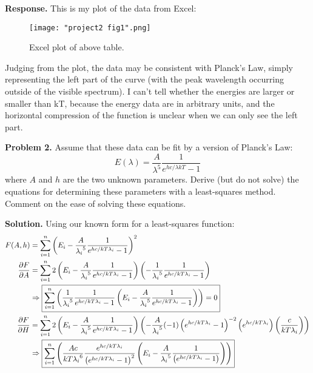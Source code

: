 \documentclass{article}
\begin{document}
\textbf{Response.} This is my plot of the data from Excel:
\begin{figure}[H]
\centering
\texttt{[image: "project2 fig1".png]}
\caption{Excel plot of above table.}
\end{figure}

Judging from the plot, the data may be consistent with Planck's Law, simply representing the left part of the curve (with the peak wavelength occurring outside of the visible spectrum). I can't tell whether the energies are larger or smaller than kT, because the energy data are in arbitrary units, and the horizontal compression of the function is unclear when we can only see the left part.

\textbf{Problem 2.} Assume that these data can be fit by a version of Planck's Law:
\begin{equation}
E(\lambda) = \frac{A}{\lambda^5}\frac{1}{e^{hc/\lambda kT} - 1}
\end{equation}
where $A$ and $h$ are the two unknown parameters. Derive (but do not solve) the equations for determining these parameters with a least-squares method. Comment on the ease of solving these equations.

\textbf{Solution.} Using our known form for a least-squares function:
\begin{equation*}
\begin{aligned}
F(A,h) &= \sum_{i=1}^n\left(E_i - \frac{A}{{\lambda_i}^5}\frac{1}{e^{hc/ kT\lambda_i} - 1}\right)^2 \\
\pdv{F}{A} &= \sum_{i=1}^n 2\left(E_i - \frac{A}{{\lambda_i}^5}\frac{1}{e^{hc/ kT\lambda_i} - 1}\right)\left(-\frac{1}{{\lambda_i}^5}\frac{1}{e^{hc/kT\lambda_i}-1}\right) \\
&\Rightarrow\boxed{\sum_{i=1}^n\left(\frac{1}{{\lambda_i}^5}\frac{1}{e^{hc/kT\lambda_i}-1}\left(E_i - \frac{A}{{\lambda_i}^5}\frac{1}{e^{hc/kT\lambda_i}-1}\right)\right)=0} \\
\pdv{F}{H} &= \sum_{i=1}^n 2\left(E_i - \frac{A}{{\lambda_i}^5}\frac{1}{e^{hc/ kT\lambda_i} - 1}\right)\left(-\frac{A}{{\lambda_i}^5}(-1)\left(e^{hc/kT\lambda_i}-1\right)^{-2}\left(e^{hc/kT\lambda_i}\right)\left(\frac{c}{kT\lambda_i}\right)\right) \\
&\Rightarrow\boxed{\sum_{i=1}^n \left(\frac{Ac}{kT{\lambda_i}^6}\frac{e^{hc/kT\lambda_i}}{\left(e^{hc/kT\lambda_i}-1\right)^2}\left(E_i-\frac{A}{{\lambda_i}^5}\frac{1}{\left(e^{hc/kT\lambda_i}-1\right)}\right)\right)}
\end{aligned}
\end{equation*}
\end{document}
